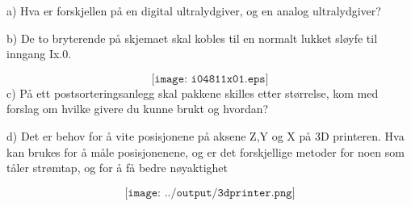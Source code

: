 
a) Hva er forskjellen på en digital ultralydgiver, og en analog ultralydgiver?

b) De to bryterende på skjemaet skal kobles til en normalt lukket sløyfe til inngang Ix.0. 

$$\texttt{[image: i04811x01.eps]}$$
c) På ett postsorteringsanlegg skal pakkene skilles etter størrelse, kom med forslag om hvilke givere du kunne brukt og hvordan?

\filbreak
d) Det er behov for å vite posisjonene på aksene Z,Y og X på 3D printeren. Hva kan brukes for å måle posisjonenene, og er det forskjellige metoder for noen som tåler strømtap, og for å få bedre nøyaktighet

$$\texttt{[image: ../output/3dprinter.png]}$$
















